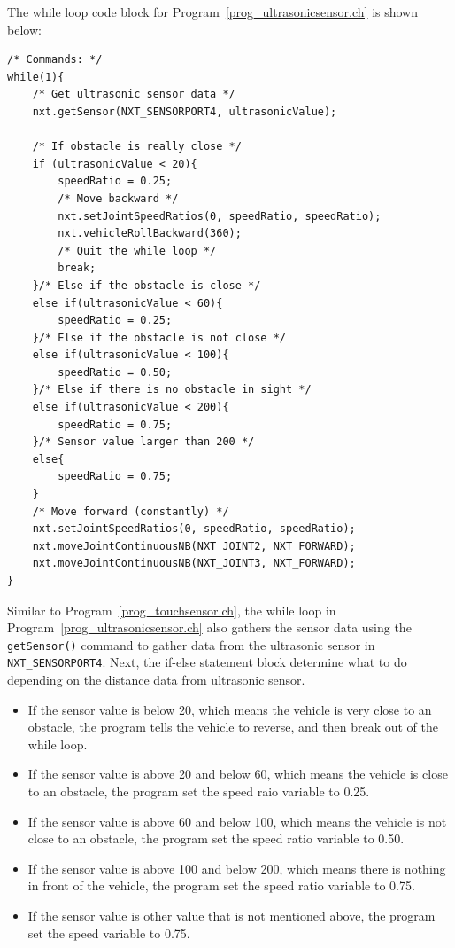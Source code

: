 \documentclass[11pt]{article}
\begin{document}
The while loop code block for Program~\ref{prog_ultrasonicsensor.ch} is shown below:
\begin{verbatim}
/* Commands: */
while(1){
    /* Get ultrasonic sensor data */
    nxt.getSensor(NXT_SENSORPORT4, ultrasonicValue);
        
    /* If obstacle is really close */
    if (ultrasonicValue < 20){
        speedRatio = 0.25;
        /* Move backward */
        nxt.setJointSpeedRatios(0, speedRatio, speedRatio);
        nxt.vehicleRollBackward(360);
        /* Quit the while loop */
        break;
    }/* Else if the obstacle is close */
    else if(ultrasonicValue < 60){
        speedRatio = 0.25;
    }/* Else if the obstacle is not close */
    else if(ultrasonicValue < 100){
        speedRatio = 0.50;
    }/* Else if there is no obstacle in sight */
    else if(ultrasonicValue < 200){
        speedRatio = 0.75;
    }/* Sensor value larger than 200 */
    else{
        speedRatio = 0.75;
    }
    /* Move forward (constantly) */
    nxt.setJointSpeedRatios(0, speedRatio, speedRatio);
    nxt.moveJointContinuousNB(NXT_JOINT2, NXT_FORWARD);
    nxt.moveJointContinuousNB(NXT_JOINT3, NXT_FORWARD);
}
\end{verbatim}
\noindent
Similar to Program~\ref{prog_touchsensor.ch}, the while loop in Program~\ref{prog_ultrasonicsensor.ch} also gathers the 
sensor data using the \verb+getSensor()+ command to gather data from the ultrasonic sensor in 
\verb+NXT_SENSORPORT4+. Next, the if-else statement block determine what to do depending on the 
distance data from ultrasonic sensor.
\begin{itemize}
\item If the sensor value is below 20, which means the vehicle is very close to an obstacle, the program tells the
    vehicle to reverse, and then break out of the while loop.
\item If the sensor value is above 20 and below 60, which means the vehicle is close to an obstacle, the
    program set the speed raio variable to 0.25.
\item If the sensor value is above 60 and below 100, which means the vehicle is not close to an obstacle, the
    program set the speed ratio variable to 0.50.
\item If the sensor value is above 100 and below 200, which means there is nothing in front of the vehicle,
    the program set the speed ratio variable to 0.75.
\item If the sensor value is other value that is not mentioned above, the program set the speed variable to 0.75.
\end{itemize}
\end{document}
